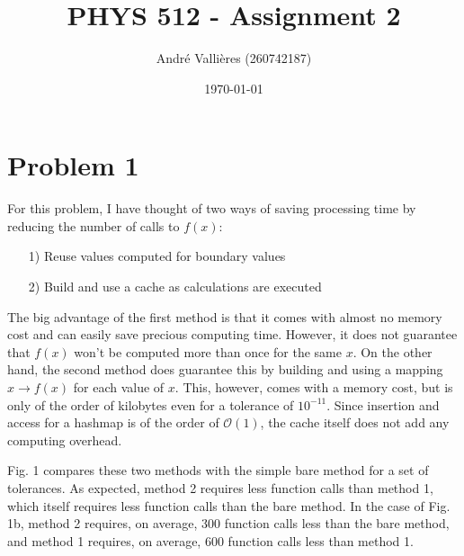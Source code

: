 \documentclass{article}
\title{PHYS 512 - Assignment 2}
\author{André Vallières (260742187)}
\date{\today}
\begin{document}
\maketitle

\section*{Problem 1}
For this problem, I have thought of two ways of saving processing time by reducing the number of calls to $f(x)$:
\begin{itemize}
    \item[1)] Reuse values computed for boundary values
    \item[2)] Build and use a cache as calculations are executed
\end{itemize}

The big advantage of the first method is that it comes with almost no memory cost and can easily save precious computing time. However, it does not guarantee that $f(x)$ won't be computed more than once for the same $x$. On the other hand, the second method does guarantee this by building and using a mapping $x \rightarrow f(x)$ for each value of $x$. This, however, comes with a memory cost, but is only of the order of kilobytes even for a tolerance of $10^{-11}$. Since insertion and access for a hashmap is of the order of $\mathcal{O}(1)$, the cache itself does not add any computing overhead. 

Fig. 1 compares these two methods with the simple bare method for a set of tolerances. As expected, method 2 requires less function calls than method 1, which itself requires less function calls than the bare method. In the case of Fig. 1b, method 2 requires, on average, 300 function calls less than the bare method, and method 1 requires, on average, 600 function calls less than method 1. 
\end{document}
